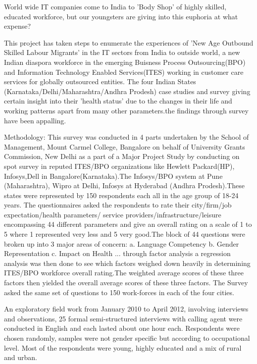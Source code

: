World wide IT companies come to India to 'Body Shop' of highly skilled, educated workforce, but our youngsters are giving into this euphoria at what expense?



This project has taken steps to enumerate the experiences of 'New Age Outbound Skilled Labour Migrants' in the IT sectors from India to outside world, a new Indian diaspora  workforce in the emerging Buisness Process Outsourcing(BPO) and Information Technology Enabled Services(ITES) working in customer care services for globally outsourced entities. The four Indian States (Karnataka/Delhi/Maharashtra/Andhra Prodesh) case studies and survey giving certain insight into their 'health status' due to the changes in their life and working patterns apart from many other parameters.the findings through survey have been appalling.

Methodology:
This survey was conducted in 4 parts undertaken by the School of Management, Mount Carmel College, Bangalore on behalf of University Grants Commission, New Delhi as a part of a Major  Project Study by conducting on spot survey in reputed ITES/BPO organizations like Hewlett Packard(HP), Infosys,Dell in Bangalore(Karnataka).The Infosys/BPO system at Pune (Maharashtra), Wipro at Delhi, Infosys at Hyderabad (Andhra Prodesh).These states were represented by 150 respondents each all in the age group of 18-24 years. The questionnaires asked the respondents to rate their city/firm/job expectation/health parameters/ service providers/infrastructure/leisure encompassing 44 different parameters and give an overall rating on a scale of 1 to 5 where 1 represented very less and 5 very good.The block of 44 questions were broken up into 3 major areas of concern:
a. Language Competency
b. Gender Representation
c. Impact on Health
... through factor analysis a regression analysis was then done to see which factors weighed down heavily in determining ITES/BPO workforce overall rating.The weighted average scores of these three factors then yielded the overall average scores of these three factors. The Survey asked the same set of questions to 150 work-forces in each of the four cities.

An exploratory field work  from January 2010 to April 2012, involving interviews and observations, 25 formal semi-structured interviews with calling agent were conducted in English and each lasted about one hour each. Respondents were chosen randomly, samples were not gender specific but according to occupational level. Most of the respondents were young, highly educated and a mix of rural and urban.

